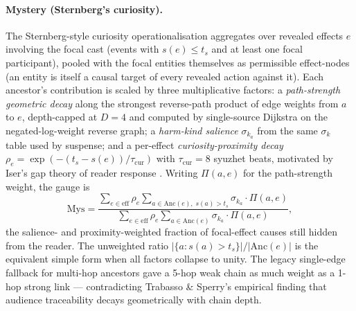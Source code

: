 \documentclass[11pt]{article}
\begin{document}
\paragraph{Mystery (Sternberg's curiosity).}
The Sternberg-style curiosity operationalisation
\citep{sternberg1978expositional,sternberg1992telling,
brewer1982stories} aggregates over revealed effects $e$ involving
the focal cast (events with $s(e) \le t_s$ and at least one focal
participant), pooled with the focal entities themselves as
permissible effect-nodes (an entity is itself a causal target of
every revealed action against it). Each ancestor's contribution
is scaled by three multiplicative factors: a \emph{path-strength
geometric decay} along the strongest reverse-path product of edge
weights from $a$ to $e$, depth-capped at $D = 4$
\citep{trabasso1985sperry} and computed by single-source
Dijkstra on the negated-log-weight reverse graph; a
\emph{harm-kind salience} $\sigma_{k_a}$ from the same
$\sigma_k$ table used by suspense; and a per-effect
\emph{curiosity-proximity decay}
$\rho_e = \exp(-(t_s - s(e))/\tau_{\mathrm{cur}})$ with
$\tau_{\mathrm{cur}} = 8$ syuzhet beats, motivated by Iser's
gap theory of reader response \citep{iser1976akt}. Writing
$\Pi(a, e)$ for the path-strength weight, the gauge is
\begin{equation}
\label{eq:mystery}
\mathrm{Mys} = \frac{
\sum_{e \in \mathrm{eff}} \rho_e \!\!\sum_{a \in \mathrm{Anc}(e),\; s(a) > t_s}\!\! \sigma_{k_a} \cdot \Pi(a, e)
}{
\sum_{e \in \mathrm{eff}} \rho_e \!\!\sum_{a \in \mathrm{Anc}(e)}\!\! \sigma_{k_a} \cdot \Pi(a, e)
},
\end{equation}
the salience- and proximity-weighted fraction of focal-effect
causes still hidden from the reader. The unweighted ratio
$|\{a : s(a) > t_s\}|/|\mathrm{Anc}(e)|$ is the equivalent simple
form when all factors collapse to unity. The legacy single-edge
fallback for multi-hop ancestors gave a 5-hop weak chain as much
weight as a 1-hop strong link --- contradicting Trabasso \&
Sperry's empirical finding that audience traceability decays
geometrically with chain depth.
\end{document}

